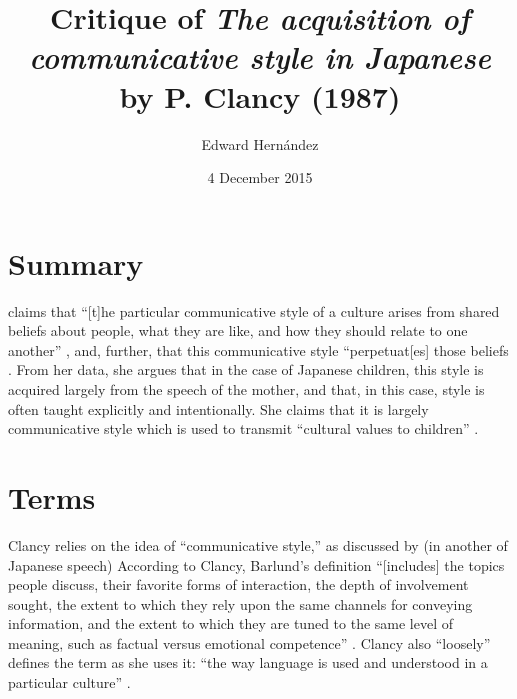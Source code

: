 \documentclass[man,12pt,natbib]{apa6}
\begin{document}
\title{Critique of \emph{The acquisition of communicative style in Japanese} by
	P. Clancy (1987)}
\author{Edward Hern\'{a}ndez}
\date{4 December 2015}
\maketitle


\section{Summary}

\citet{Clancy87} claims that ``[t]he particular communicative style of a
culture arises from shared beliefs about people, what they are like, and how
they should relate to one another'' \cite[p.~245]{Clancy87}, and, further, that
this communicative style ``perpetuat[es] those beliefs \cite[p.~245]{Clancy87}.
From her data, she argues that in the case of Japanese children, this style is
acquired largely from the speech of the mother, and that, in this case, style
is often taught explicitly and intentionally.  She claims that it is largely
communicative style which is used to transmit ``cultural values to children''
\cite[p.~246]{Clancy87}.

\section{Terms}

Clancy relies on the idea of ``communicative style,'' as discussed by
\citet{Barlund75} (in another of Japanese speech) According to Clancy,
Barlund's definition ``[includes] the topics people discuss, their favorite
forms of interaction, the depth of involvement sought, the extent to which they
rely upon the same channels for conveying information, and the extent to which
they are tuned to the same level of meaning, such as factual versus emotional
competence'' \citep[p.~213]{Clancy87}.
Clancy also ``loosely'' defines the term as she uses it: ``the way language is
used and understood in a particular culture'' \citep[p.~213]{Clancy87}.
\end{document}
